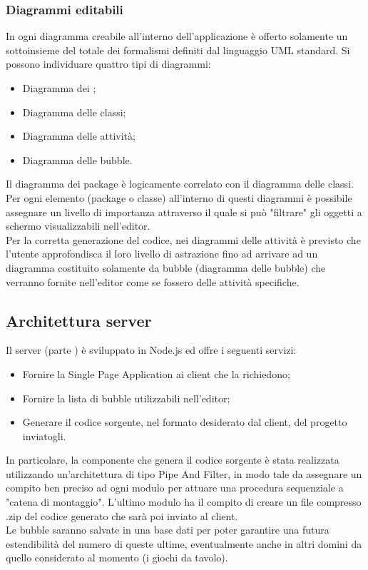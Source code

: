\documentclass[../PianoDiQualifica.tex]{subfiles}
\begin{document}
			\subsubsection{Diagrammi editabili}
				In ogni diagramma creabile all'interno dell'applicazione è offerto solamente un
				sottoinsieme del totale dei formalismi definiti dal linguaggio UML standard.
				Si possono individuare quattro tipi di diagrammi:
				\begin{itemize}
					\item Diagramma dei ;
					\item Diagramma delle classi;
					\item Diagramma delle attività;
					\item Diagramma delle bubble.
				\end{itemize}
				Il diagramma dei package è logicamente correlato con il diagramma delle classi. Per ogni
				elemento (package o classe) all'interno di questi diagrammi è possibile assegnare un
				livello di importanza attraverso il quale si può "filtrare" gli oggetti a schermo
				visualizzabili nell'editor.\\
				Per la corretta generazione del codice, nei diagrammi delle attività è previsto che
				l'utente approfondisca il loro livello di astrazione fino ad arrivare ad un diagramma
				costituito solamente da bubble (diagramma delle bubble) che verranno fornite nell'editor
				come se fossero delle attività specifiche.
		\subsection{Architettura server}
			Il server (parte ) è sviluppato in Node.js ed offre i seguenti servizi:
			\begin{itemize}
				\item Fornire la Single Page Application ai client che la richiedono;
				\item Fornire la lista di bubble utilizzabili nell'editor;
				\item Generare il codice sorgente, nel formato desiderato dal client, del progetto
				inviatogli.
			\end{itemize}
			In particolare, la componente che genera il codice sorgente è stata realizzata utilizzando
			un'architettura di tipo Pipe And Filter, in modo tale da assegnare un compito ben preciso
			ad ogni modulo per attuare una procedura sequenziale a "catena di montaggio". L'ultimo
			modulo ha il compito di creare un file compresso .zip del codice generato che sarà poi
			inviato al client.\\
			Le bubble saranno salvate in una base dati per poter garantire una futura estendibilità del
			numero di queste ultime, eventualmente anche in altri domini da quello considerato al
			momento (i giochi da tavolo).
\end{document}
